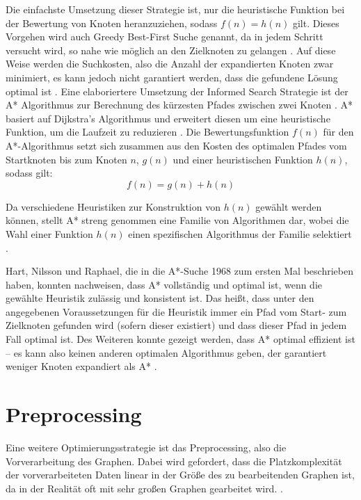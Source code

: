 Die einfachste Umsetzung dieser Strategie ist, nur die heuristische Funktion bei der Bewertung von Knoten heranzuziehen, sodass $f(n)=h(n)$ gilt. Dieses Vorgehen wird auch Greedy Best-First Suche genannt, da in jedem Schritt versucht wird, so nahe wie möglich an den Zielknoten zu gelangen \cite{Russel2010}. Auf diese Weise werden die Suchkosten, also die Anzahl der expandierten Knoten zwar minimiert, es kann jedoch nicht garantiert werden, dass die gefundene Lösung optimal ist \cite{Russel2010}.
\label{A*}
Eine elaboriertere Umsetzung der Informed Search Strategie ist der A* Algorithmus zur Berechnung des kürzesten Pfades zwischen zwei Knoten \cite{Russel2010}. A* basiert auf Dijkstra’s Algorithmus und erweitert diesen um eine heuristische Funktion, um die Laufzeit zu reduzieren \cite{Peralta2020}. Die Bewertungsfunktion $f(n)$ für den A*-Algorithmus setzt sich zusammen aus den Kosten des optimalen Pfades vom Startknoten bis zum Knoten $n$, $g(n)$ und einer heuristischen Funktion $h(n)$, sodass gilt:
\begin{equation} \label{eq:3.1}
	f(n)=g(n)+h(n)
\end{equation}

Da verschiedene Heuristiken zur Konstruktion von $h(n)$ gewählt werden können, stellt A* streng genommen eine Familie von Algorithmen dar, wobei die Wahl einer Funktion $h(n)$ einen spezifischen Algorithmus der Familie selektiert \cite{Hart1968}. 

Hart, Nilsson und Raphael, die in \cite{Hart1968} die A*-Suche 1968 zum ersten Mal beschrieben haben, konnten nachweisen, dass A* vollständig und optimal ist, wenn die gewählte Heuristik zulässig und konsistent ist. Das heißt, dass unter den angegebenen Voraussetzungen für die Heuristik immer ein Pfad vom Start- zum Zielknoten gefunden wird (sofern dieser existiert) und dass dieser Pfad in jedem Fall optimal ist. Des Weiteren konnte gezeigt werden, dass A* optimal effizient ist – es kann also keinen anderen optimalen Algorithmus geben, der garantiert weniger Knoten expandiert als A* \cite{Russel2010}.

\section{Preprocessing}
Eine weitere Optimierungsstrategie ist das Preprocessing, also die Vorverarbeitung des Graphen. Dabei wird gefordert, dass die Platzkomplexität der vorverarbeiteten Daten linear in der Größe des zu bearbeitenden Graphen ist, da in der Realität oft mit sehr großen Graphen gearbeitet wird. \cite{Goldberg2005}. 

